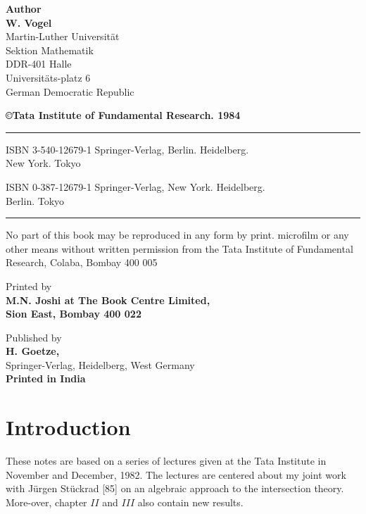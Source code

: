 \begin{center}
{\large\bf Author}\\[5pt]
{\large\bf W. Vogel}\\
{Martin-Luther Universit\"at}\\
{Sektion Mathematik}\\
{DDR-401 Halle}\\
{Universit\"ats-platz 6}\\
{German Democratic Republic}

\vfill

{\bf\copyright Tata Institute of Fundamental  Research. 1984}
\vfill

\rule{\textwidth}{.5pt}

ISBN 3-540-12679-1 Springer-Verlag, Berlin. Heidelberg.\\ New York. Tokyo

ISBN 0-387-12679-1 Springer-Verlag, New York. Heidelberg.\\ Berlin. Tokyo

\rule{\textwidth}{.5pt}

\vfill

\parbox{0.7\textwidth}{No part of this book may be reproduced in any form by
print. microfilm or any other means without written permission
from the Tata Institute of Fundamental Research, Colaba, Bombay
400 005}

\vfill

{Printed by}\\[5pt]
{\large\bf  M.N. Joshi at The Book Centre Limited,}\\
{\bf  Sion East, Bombay 400 022}

\vfill

{Published by}\\[5pt] 
{\large\bf  H. Goetze,}\\
{Springer-Verlag, Heidelberg, West Germany}\\[20pt]
{\bf Printed in India}
\end{center}
\eject

\chapter*{Introduction}

 
These notes are based on a series of lectures given at the Tata
Institute in November and December, 1982. The lectures are centered
about my joint work with J\"{u}rgen St\"{u}ckrad [85] on an
algebraic approach to the intersection theory. More-over, chapter $II$
and $III$ also contain new results. 

